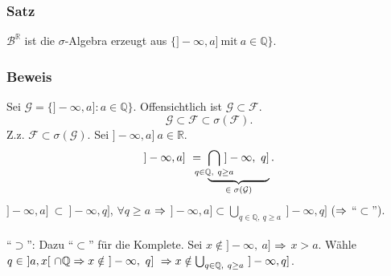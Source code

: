 \subsubsection{Satz}
$\mathcal{B}^\mathbb{R}$ ist die $\sigma$-Algebra erzeugt aus $\{]-\infty,a]\ \text{mit}\ a\in\mathbb{Q}\}$.
\subsubsection{Beweis}
Sei $\mathcal{G}=\{]-\infty,a]\colon a\in\mathbb{Q}\}$. Offensichtlich ist $\mathcal{G}\subset\mathcal{F}$.
\[\mathcal{G}\subset\mathcal{F}\subset\sigma(\mathcal{F}).\]
Z.z. $\mathcal{F}\subset\sigma(\mathcal{G})$. Sei $]-\infty,a]\ a\in\mathbb{R}$.
\[]-\infty,a]\ =\ \ubr{\bigcap_{\mathclap{q\in\mathbb{Q},\ q\geq a}}\ ]-\infty,\ q]}{$\in\sigma(\mathcal{G})$}.\]
$]-\infty,a]\ \subset\ ]-\infty,q]$, $\forall q\geq a$ $\Rightarrow$ $]-\infty,a]\subset\bigcup_{q\in\mathbb{Q},\ q\geq a}\ ]-\infty,q]$ ($\Rightarrow$ ``$\subset$'').
\\~\\
``$\supset$'': Dazu ``$\subset$'' f\"ur die Komplete. Sei $x\notin]-\infty,\ a]$ $\Rightarrow$ $x>a$. W\"ahle $q\in\ ]a,x[\ \cap\mathbb{Q}\RA x\notin\ ]-\infty,\ q]\ \RA x\notin\bigcup_{q\in\mathbb{Q},\ q\geq a}\ ]-\infty,q]$.
